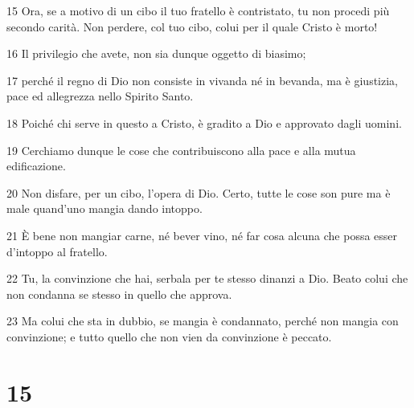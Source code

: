 \par 15 Ora, se a motivo di un cibo il tuo fratello è contristato, tu non procedi più secondo carità. Non perdere, col tuo cibo, colui per il quale Cristo è morto!
\par 16 Il privilegio che avete, non sia dunque oggetto di biasimo;
\par 17 perché il regno di Dio non consiste in vivanda né in bevanda, ma è giustizia, pace ed allegrezza nello Spirito Santo.
\par 18 Poiché chi serve in questo a Cristo, è gradito a Dio e approvato dagli uomini.
\par 19 Cerchiamo dunque le cose che contribuiscono alla pace e alla mutua edificazione.
\par 20 Non disfare, per un cibo, l'opera di Dio. Certo, tutte le cose son pure ma è male quand'uno mangia dando intoppo.
\par 21 È bene non mangiar carne, né bever vino, né far cosa alcuna che possa esser d'intoppo al fratello.
\par 22 Tu, la convinzione che hai, serbala per te stesso dinanzi a Dio. Beato colui che non condanna se stesso in quello che approva.
\par 23 Ma colui che sta in dubbio, se mangia è condannato, perché non mangia con convinzione; e tutto quello che non vien da convinzione è peccato.

\chapter{15}

